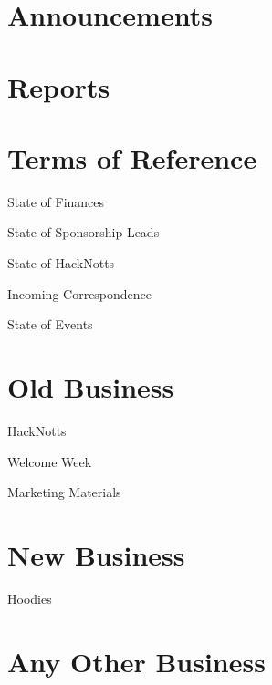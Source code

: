 \documentclass[11pt,hacksoc,agenda]{meetingmins}
\begin{document}
\maketitle

\section{Announcements}
\begin{items}
\item
\end{items}

\section{Reports}

\section{Terms of Reference}
\begin{items}
\item {State of Finances}
\item {State of Sponsorship Leads}
\item {State of HackNotts}
\item {Incoming Correspondence}
\item {State of Events}
\end{items}

\section{Old Business}
\begin{items}
\item{HackNotts}
\item{Welcome Week}
\item{Marketing Materials}
\end{items}

\section{New Business}
\begin{items}
\item{Hoodies}
\end{items}

\section{Any Other Business}

\vspace{1em}
\end{document}
